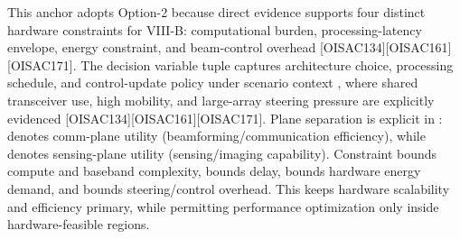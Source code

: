 {}This anchor adopts Option-2 because direct evidence supports four distinct hardware constraints for VIII-B: computational burden, processing-latency envelope, energy constraint, and beam-control overhead [O\markdownRendererUnderscore{}ISAC\markdownRendererUnderscore{}134][O\markdownRendererUnderscore{}ISAC\markdownRendererUnderscore{}161][O\markdownRendererUnderscore{}ISAC\markdownRendererUnderscore{}171]. The decision variable tuple  captures architecture choice, processing schedule, and control-update policy under scenario context , where shared transceiver use, high mobility, and large-array steering pressure are explicitly evidenced [O\markdownRendererUnderscore{}ISAC\markdownRendererUnderscore{}134][O\markdownRendererUnderscore{}ISAC\markdownRendererUnderscore{}161][O\markdownRendererUnderscore{}ISAC\markdownRendererUnderscore{}171]. Plane separation is explicit in :  denotes comm-plane utility (beamforming/communication efficiency), while  denotes sensing-plane utility (sensing/imaging capability). Constraint  bounds compute and baseband complexity,  bounds delay,  bounds hardware energy demand, and  bounds steering/control overhead. This keeps hardware scalability and efficiency primary, while permitting performance optimization only inside hardware-feasible regions.\markdownRendererInterblockSeparator
